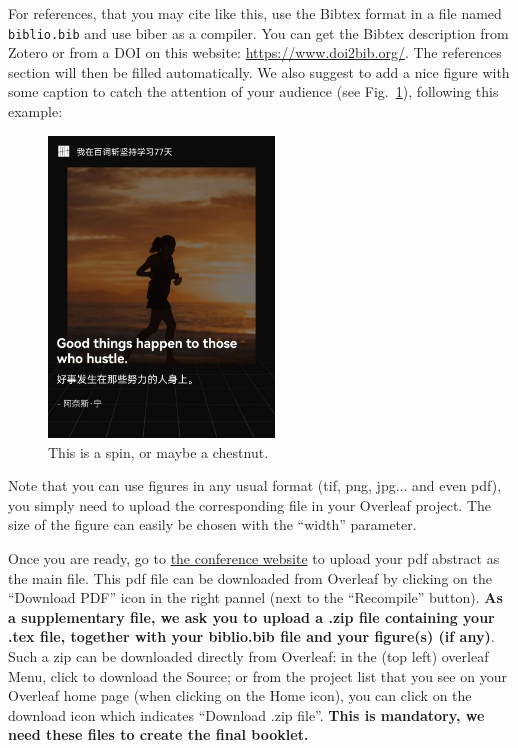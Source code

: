 \documentclass[a4paper, 10pt]{article}
\begin{document}
For references, that you may cite like this\cite{wolfSpintronicsSpinBasedElectronics2001}, use the Bibtex format in a file named \texttt{biblio.bib} and use biber as a compiler. You can get the Bibtex description from Zotero or from a DOI on this website: \url{https://www.doi2bib.org/}.  The references section will then be filled automatically. We also suggest to add a nice figure with some caption to catch the attention of your audience (see Fig.~\ref{fig:spin}), following this example:
\begin{figure}[ht]
	\centering
	\includegraphics[width=6cm]{111.jpg}
	\caption{This is a spin, or maybe a chestnut.}
	\label{fig:spin}
\end{figure}

Note that you can use figures in any usual format (tif, png, jpg... and even pdf), you simply need to upload the corresponding file in your Overleaf project. The size of the figure can easily be chosen with the ``width'' parameter.

Once you are ready, go to \href{https://cln2025.sciencesconf.org/}{the conference website} to upload your pdf abstract as the main file. This pdf file can be downloaded from Overleaf by clicking on the ``Download PDF'' icon in the right pannel (next to the ``Recompile'' button). \textbf{As a supplementary file, we ask you to upload a .zip file containing your .tex file, together with your biblio.bib file and your figure(s) (if any)}. Such a zip can be downloaded directly from Overleaf: in the (top left) overleaf Menu, click to download the Source; or from the project list that you see on your Overleaf home page (when clicking on the Home icon), you can click on the download icon which indicates ``Download .zip file''. \textbf{\textcolor{Firebrick1}{This is mandatory, we need these files to create the final booklet.}}
\end{document}
